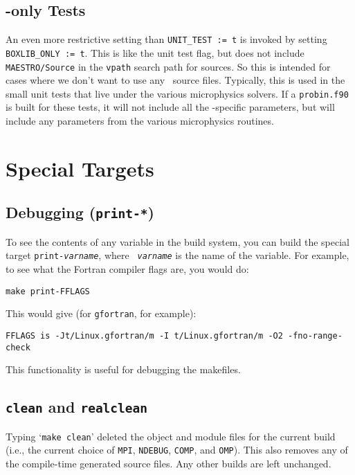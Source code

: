 \subsection{\boxlib-only Tests}

An even more restrictive setting than {\tt UNIT\_TEST := t} is invoked
by setting {\tt BOXLIB\_ONLY := t}.  This is like the unit test flag,
but does not include {\tt MAESTRO/Source} in the {\tt vpath} search
path for sources.  So this is intended for cases where we don't want
to use any \maestro\ source files.  Typically, this is used in the
small unit tests that live under the various microphysics solvers.  If
a {\tt probin.f90} is built for these tests, it will not include all
the \maestro-specific parameters, but will include any parameters from
the various microphysics routines.


\section{Special Targets}

\subsection{Debugging ({\tt print-*})}

To see the contents of any variable in the build system, you can build
the special target {\tt print-{\em varname}}, where {\tt {\em
varname}} is the name of the variable.  For example, to see what the
Fortran compiler flags are, you would do:
\begin{verbatim}
make print-FFLAGS
\end{verbatim}
This would give (for {\tt gfortran}, for example):
\begin{verbatim}
FFLAGS is -Jt/Linux.gfortran/m -I t/Linux.gfortran/m -O2 -fno-range-check
\end{verbatim}
This functionality is useful for debugging the makefiles.

\subsection{{\tt clean} and {\tt realclean}}

Typing `{\tt make clean}' deleted the object and module files for the
current build (i.e., the current choice of {\tt MPI}, {\tt NDEBUG},
{\tt COMP}, and {\tt OMP}).  This also removes any of the compile-time
generated source files.  Any other builds are left unchanged.

